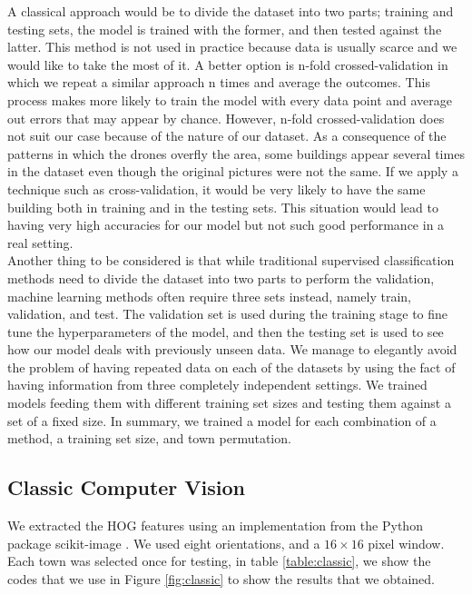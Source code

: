 A classical approach would be to divide the dataset into two parts; training and testing sets, the model is trained with the former, and then tested against the latter. This method is not used in practice because data is usually scarce and we would like to take the most of it. A better option is n-fold crossed-validation in which we repeat a similar approach n times and average the outcomes. This process makes more likely to train the model with every data point and average out errors that may appear by chance. However, n-fold crossed-validation does not suit our case because of the nature of our dataset. As a consequence of the patterns in which the drones overfly the area, some buildings appear several times in the dataset even though the original pictures were not the same. If we apply a technique such as cross-validation, it would be very likely to have the same building both in training and in the testing sets. This situation would lead to having very high accuracies for our model but not such good performance in a real setting.\\

Another thing to be considered is that while traditional supervised classification methods need to divide the dataset into two parts to perform the validation, machine learning methods often require three sets instead, namely train, validation, and test. The validation set is used during the training stage to fine tune the hyperparameters of the model, and then the testing set is used to see how our model deals with previously unseen data. We manage to elegantly avoid the problem of having repeated data on each of the datasets by using the fact of having information from three completely independent settings. We trained models feeding them with different training set sizes and testing them against a set of a fixed size. In summary, we trained a model for each combination of a method, a training set size, and town permutation.\\

\subsection{Classic Computer Vision}

We extracted the HOG features using an implementation from the Python package scikit-image \cite{scikit-learn}. We used eight orientations, and a $16\times16$ pixel window. Each town was selected once for testing, in table \ref{table:classic}, we show the codes that we use in Figure \ref{fig:classic} to show the results that we obtained.\\

